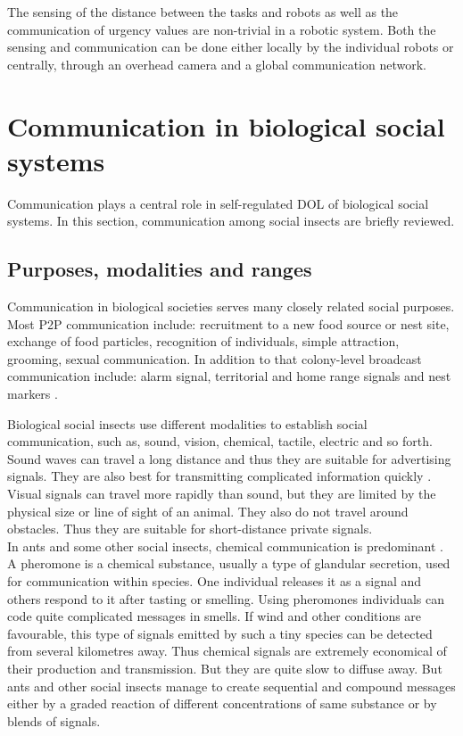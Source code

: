 \documentclass{intech}
\begin{document}
The sensing of the distance between the tasks and robots as well as the communication of urgency values are non-trivial in a robotic system.  Both the sensing and communication can be done either locally by the individual robots or centrally, through an overhead camera and a global communication network.
\section{Communication in biological social systems}
\label{bio-comm}
Communication plays a central role in self-regulated DOL of biological social systems. In this section, communication among  social insects are briefly reviewed.
%
\subsection{Purposes, modalities and ranges}
Communication in biological societies serves many closely related social purposes. Most P2P communication include: recruitment to a new food source or nest site, exchange of food particles, recognition of individuals, simple attraction, grooming, sexual communication. In addition to that colony-level broadcast communication include: alarm signal, territorial and home range signals and nest markers \citep{Holldobler1990}.

Biological social insects use different modalities to establish social communication, such as, sound, vision, chemical, tactile,  electric and so forth.  Sound waves can travel a long distance and thus they are suitable for advertising signals. They are also best for transmitting complicated information quickly \citep{Slater1986}. Visual signals can travel more rapidly than sound, but they are limited by the physical size or line of sight of an animal. They also do not travel around obstacles. Thus they are suitable for short-distance private signals.\\

In ants and some other social insects, chemical communication is predominant \citep{Holldobler1990}. A pheromone is a chemical substance, usually a type of glandular secretion, used for communication within species. One individual releases it as a signal and others respond to it after tasting or smelling. Using pheromones individuals can code quite complicated messages in smells. If wind and other conditions are favourable,  this type of signals emitted by such a tiny species can be detected from several kilometres away. Thus chemical signals are extremely economical of their production and transmission. But they are quite slow to diffuse away. But ants and other social insects manage to create sequential and compound messages either by a graded reaction of different concentrations of same substance or by blends of signals.
\end{document}
